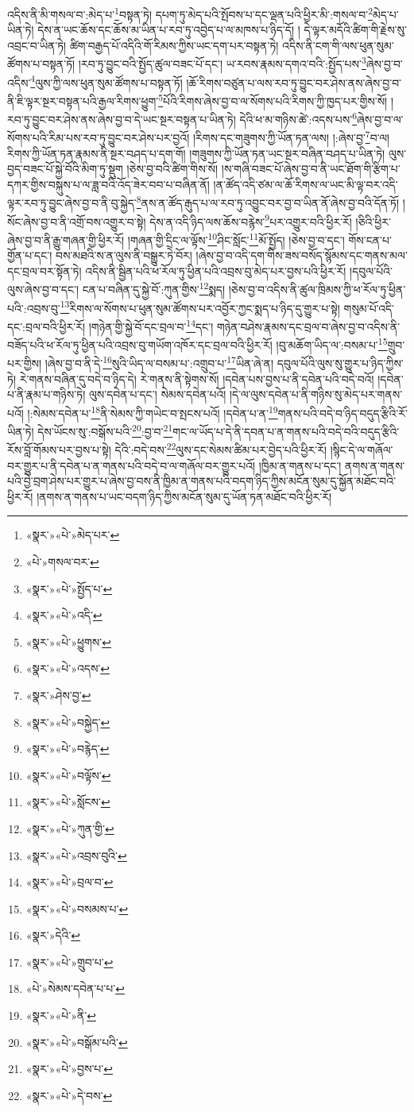 འདིས་ནི་མི་གསལ་བ་:མེད་པ་\footnote{«སྣར་»«པེ་»མེད་པར་}བསྟན་ཏེ། དཔག་ཏུ་མེད་པའི་སྤོབས་པ་དང་ལྡན་པའི་ཕྱིར་མི་:གསལ་བ་\footnote{«པེ་»གསལ་བར་}མེད་པ་ཡིན་ཏེ། དེས་ན་ཡང་ཆོས་དང་ཆོས་མ་ཡིན་པ་རབ་ཏུ་འབྱེད་པ་ལ་མཁས་པ་ཉིད་དོ། །
དེ་ལྟར་མདོའི་ཚིག་གི་རྗེས་སུ་འབྲང་བ་ཡིན་ཏེ། ཚིག་བརྒྱད་པོ་འདིའི་གོ་རིམས་ཀྱིས་ཡང་དག་པར་བསྟན་ཏེ། འདིས་ནི་ངག་གི་ལས་ཕུན་སུམ་ཚོགས་པ་བསྟན་ཏོ། །རབ་ཏུ་བྱུང་བའི་སྤྱོད་ཚུལ་བཟང་པོ་དང་། ཡ་རབས་རྣམས་དགའ་བའི་:སྤྱོད་པས་\footnote{«སྣར་»«པེ་»སྤྱོད་པ་}ཞེས་བྱ་བ་འདིས་\footnote{«སྣར་»«པེ་»འདི་}ལུས་ཀྱི་ལས་ཕུན་སུམ་ཚོགས་པ་བསྟན་ཏོ། །ཆོ་རིགས་བཙུན་པ་ལས་རབ་ཏུ་བྱུང་བར་ཤེས་ནས་ཞེས་བྱ་བ་ནི་ཇི་ལྟར་སྔར་བསྟན་པའི་རྒྱལ་རིགས་ཕྱུག་\footnote{«སྣར་»«པེ་»ཕྱུགས་}པོའི་རིགས་ཞེས་བྱ་བ་ལ་སོགས་པའི་རིགས་ཀྱི་ཁྱད་པར་གྱིས་སོ། །རབ་ཏུ་བྱུང་བར་ཤེས་ནས་ཞེས་བྱ་བ་དེ་ཡང་སྔར་བསྟན་པ་ཡིན་ཏེ། དེའི་ཕ་མ་གཉིས་ཚེ་:འདས་པས་\footnote{«སྣར་»«པེ་»འདས་}ཞེས་བྱ་བ་ལ་སོགས་པའི་རིམ་པས་རབ་ཏུ་བྱུང་བར་ཤེས་པར་བྱའོ། །རིགས་དང་གཟུགས་ཀྱི་ཡོན་ཏན་ལས། །:ཞེས་བྱ་\footnote{«སྣར་»ཤེས་བྱ་}བ་ལ། རིགས་ཀྱི་ཡོན་ཏན་རྣམས་ནི་སྔར་བཤད་པ་དག་གོ། །གཟུགས་ཀྱི་ཡོན་ཏན་ཡང་སྔར་བཞིན་བཤད་པ་ཡིན་ཏེ། ལུས་བྱད་བཟང་པོ་སྐྱེ་བོའི་མིག་ཏུ་སྡུག །ཅེས་བྱ་བའི་ཚིག་གིས་སོ། །ས་གཞི་བཟང་པོ་ཞེས་བྱ་བ་ནི་ཡང་ཐོག་གི་རྩིག་པ་དཀར་གྱིས་བསྐུས་པ་ལ་ཟླ་བའི་འོད་ཟེར་བབ་པ་བཞིན་ནོ། །ན་ཚོད་འདི་ཙམ་ལ་ཆོ་རིགས་ལ་ཡང་མི་ལྟ་བར་འདི་ལྟར་རབ་ཏུ་བྱུང་ཞེས་བྱ་བ་ནི་བུ་སྐྱེད་\footnote{«སྣར་»«པེ་»བསྐྱེད་}ནས་ན་ཚོད་རྒུད་པ་ལ་རབ་ཏུ་འབྱུང་བར་བྱ་བ་ཡིན་ནོ་ཞེས་བྱ་བའི་དོན་ཏོ། །སོང་ཞེས་བྱ་བ་ནི་འགྲོ་བས་འགྱུར་བ་སྟེ། དེས་ན་འདི་ཉིད་ལས་ཆོས་བརྙེས་\footnote{«སྣར་»«པེ་»བརྙེད་}པར་འགྱུར་བའི་ཕྱིར་རོ། །ཅིའི་ཕྱིར་ཞེས་བྱ་བ་ནི་རྒྱུ་གཞན་གྱི་ཕྱིར་རོ། །གཞན་གྱི་དྲིང་ལ་ལྟོས་\footnote{«སྣར་»«པེ་»བལྟོས་}ཤིང་སློང་\footnote{«སྣར་»«པེ་»སློངས་}མོ་སྤྱོད། །ཅེས་བྱ་བ་དང་། གོས་ངན་པ་གྱོན་པ་དང་། བས་མཐའི་ས་ན་ལུས་ནི་བསྒྱུར་ཏེ་བོར། །ཞེས་བྱ་བ་འདི་དག་གིས་ཟས་བསོད་སྙོམས་དང་གནས་མལ་དང་བྲལ་བར་སྟོན་ཏེ། འདིས་ནི་སྦྱིན་པའི་ཕ་རོལ་ཏུ་ཕྱིན་པའི་འབྲས་བུ་མེད་པར་བྱས་པའི་ཕྱིར་རོ། །དབུལ་པོའི་ལུས་ཞེས་བྱ་བ་དང་། ངན་པ་བཞིན་དུ་སྐྱེ་བོ་:ཀུན་གྱིས་\footnote{«སྣར་»«པེ་»ཀུན་གྱི་}སྨད། །ཅེས་བྱ་བ་འདིས་ནི་ཚུལ་ཁྲིམས་ཀྱི་ཕ་རོལ་ཏུ་ཕྱིན་པའི་:འབྲས་བུ་\footnote{«སྣར་»«པེ་»འབྲས་བུའི་}རིགས་ལ་སོགས་པ་ཕུན་སུམ་ཚོགས་པར་འབྱོར་ཀྱང་སྨད་པ་ཉིད་དུ་གྱུར་པ་སྟེ། གསུམ་པོ་འདི་དང་:བྲལ་བའི་ཕྱིར་རོ། །གཉེན་གྱི་སྐྱེ་བོ་དང་བྲལ་བ་\footnote{«སྣར་»«པེ་»བྲལ་བ་}དང་། གཉེན་བཤེས་རྣམས་དང་བྲལ་བ་ཞེས་བྱ་བ་འདིས་ནི་བཟོད་པའི་ཕ་རོལ་ཏུ་ཕྱིན་པའི་འབྲས་བུ་གཡོག་འཁོར་དང་བྲལ་བའི་ཕྱིར་རོ། །བུ་མཆོག་ཡིད་ལ་:བསམ་པ་\footnote{«སྣར་»«པེ་»བསམས་པ་}གྲུབ་པར་གྱིས། །ཞེས་བྱ་བ་ནི་དེ་\footnote{«སྣར་»དེའི་}སུའི་ཡིད་ལ་བསམ་པ་:འགྲུབ་པ་\footnote{«སྣར་»«པེ་»གྲུབ་པ་}ཡིན་ཞེ་ན། དབུལ་པོའི་ལུས་སུ་གྱུར་པ་ཉིད་ཀྱིས་ཏེ། རེ་གནས་བཞིན་དུ་བདེ་བ་ཉིད་དེ། རེ་གནས་ནི་སྟེགས་སོ། །དབེན་པས་བྱས་པ་ནི་དབེན་པའི་བདེ་བའོ། །དབེན་པ་ནི་རྣམ་པ་གཉིས་ཏེ། ལུས་དབེན་པ་དང་། སེམས་དབེན་པའོ། །དེ་ལ་ལུས་དབེན་པ་ནི་གཉིས་སུ་མེད་པར་གནས་པའོ། །:སེམས་དབེན་པ་\footnote{«པེ་»སེམས་དབེན་པ་པ་}ནི་སེམས་ཀྱི་གཡེང་བ་སྤངས་པའོ། །དབེན་པ་ན་\footnote{«སྣར་»«པེ་»ནི་}གནས་པའི་བདེ་བ་ཉིད་བདུད་རྩིའི་རོ་ཡིན་ཏེ། དེས་ཡོངས་སུ་:བསྒོས་པའི་\footnote{«སྣར་»«པེ་»བསྒོམ་པའི་}:བྱ་བ་\footnote{«སྣར་»«པེ་»བྱས་པ་}གང་ལ་ཡོད་པ་དེ་ནི་དབན་པ་ན་གནས་པའི་བདེ་བའི་བདུད་རྩིའི་རོས་བློ་གོམས་པར་བྱས་པ་སྟེ། དེའི་:བདེ་བས་\footnote{«སྣར་»«པེ་»དེ་བས་}ལུས་དང་སེམས་ཚིམ་པར་བྱེད་པའི་ཕྱིར་རོ། །སྙིང་དེ་ལ་གཞོལ་བར་གྱུར་པ་ནི་དབེན་པ་ན་གནས་པའི་བདེ་བ་ལ་གཞོལ་བར་གྱུར་པའོ། །ཁྱིམ་ན་གནས་པ་དང་། ནགས་ན་གནས་པའི་བྱེ་བྲག་ཤེས་པར་གྱུར་པ་ཞེས་བྱ་བས་ནི་ཁྱིམ་ན་གནས་པའི་བདག་ཉིད་ཀྱིས་མངོན་སུམ་དུ་སྐྱོན་མཐོང་བའི་ཕྱིར་རོ། །ནགས་ན་གནས་པ་ཡང་བདག་ཉིད་ཀྱིས་མངོན་སུམ་དུ་ཡོན་ཏན་མཐོང་བའི་ཕྱིར་རོ། 